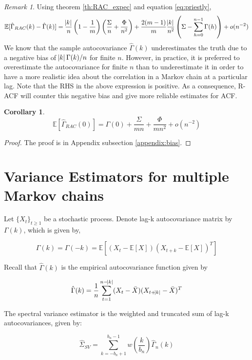 \documentclass[11pt]{article}
\newcommand{\E}{\mathbb{E}}
\newtheorem{corollary}{Corollary}
\theoremstyle{remark}
\newtheorem{remark}{Remark}
\begin{document}
\begin{remark} \label{rmrk:exp_racf_minus_acf}
Using theorem \ref{th:RAC_expec} and equation \ref{eq:priestly},
\[
\mathbb{E}[\hat{\Gamma}_{RAC}(k) - \hat{\Gamma}(k)] = \dfrac{\abs{k}}{n}\left(1 - \dfrac{1}{m}\right)\left(\dfrac{\Sigma}{n} + \dfrac{\Phi}{n^2}\right) + \dfrac{2(m-1)}{m}\dfrac{\abs{k}}{n^2} \left(\Sigma - \sum_{h=0}^{n-1}\Gamma(h)\right) + o(n^{-2})
\]
We know that the sample autocovariance $\hat{\Gamma}(k)$ underestimates the truth due to a negative bias of $\abs{k}\Gamma(k)/n$ for finite $n$. However, in practice, it is preferred to overestimate the autocovariance for finite $n$ than to underestimate it in order to have a more realistic idea about the correlation in a Markov chain at a particular lag.  Note that the RHS in the above expression is positive. As a consequence, R-ACF will counter this negative bias and give more reliable estimates for ACF. 

\end{remark}

\begin{corollary} \label{cor:lag0_expectation}
\[
\mathbb{E}[\hat{\Gamma}_{RAC}(0)] = \Gamma(0) + \dfrac{\Sigma}{mn} + \dfrac{\Phi}{mn^2} + o(n^{-2})
\]
\end{corollary}

\begin{proof}
 The proof is in Appendix subsection \ref{appendix:bias}.
\end{proof}

\section{Variance Estimators for multiple Markov chains} \label{sec:variance_est}

Let $\{X_t\}_{t \geq 1}$ be a stochastic process. Denote lag-k autocovariance matrix by $\Gamma(k)$, which is given by,

\[
\Gamma(k) = \Gamma(-k) = \E[(X_t - \E[X])(X_{t+k} - \E[X])^T]
\]

Recall that $\hat{\Gamma}(k)$ is the empirical autocovariance function given by 

\[
\hat{\Gamma}(k) = \dfrac{1}{n}\sum_{t=1}^{n-\abs{k}}(X_t - \bar{X})(X_{t + \abs{k}} - \bar{X})^T
\]

The spectral variance estimator is the weighted and truncated sum of lag-k autocovariances, given by:

\[
\hat{\Sigma}_{SV} = \sum_{k=-b_n+1}^{b_n-1}w\left(\dfrac{k}{b_n}\right)\hat{\Gamma}_n(k)
\]
\end{document}
